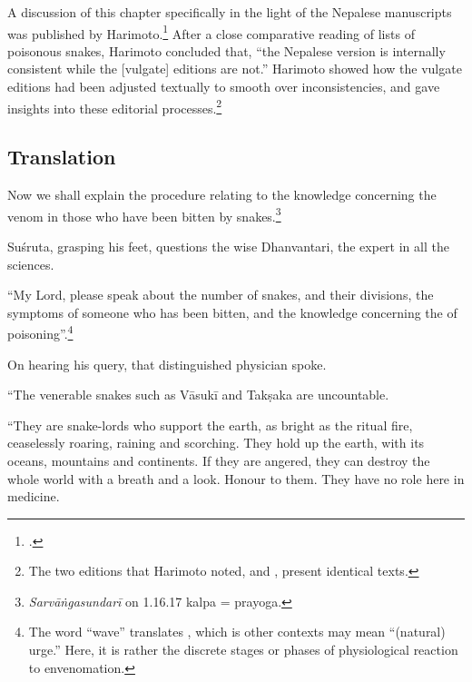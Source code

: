 A discussion of this chapter specifically in the light of the Nepalese
manuscripts was published by Harimoto.\footcite[101--104]{hari-2011} After a
close comparative reading of lists of poisonous snakes, Harimoto concluded
that, “the Nepalese version is internally consistent while the [vulgate]
editions are not.”  Harimoto showed how the vulgate editions had been
adjusted textually to smooth over inconsistencies, and gave insights into
these editorial processes.\footnote{The two editions that Harimoto noted,
    \cite{vulgate} and \cite{bhat-1889}, present identical texts.}


\subsection{Translation}

\begin{translation}
    \item[1] Now we shall explain the procedure relating to the
knowledge concerning the venom in those who have been bitten by 
snakes.\footnote{\emph{Sarvāṅgasundarī} on 1.16.17 kalpa = prayoga.}
    
    \item[3] Suśruta, grasping his feet, questions the wise Dhanvantari, the 
    expert in all the sciences.
    
    \item[4]
    
    “My Lord, please speak about the number of snakes, and their divisions,
the symptoms of someone who has been bitten, and the knowledge
concerning the  of poisoning”.\footnote{The word
    “wave” translates , which is other contexts may mean
    “(natural) urge.”  Here, it is rather the discrete stages or phases of
    physiological reaction to envenomation.}
        
    \item[5]
    
    On hearing his query, that distinguished physician spoke.
    
    “The venerable snakes such as Vāsukī and Takṣaka are uncountable. 
    
\item[6--9ab]

“They are snake-lords who support the earth, as bright as the ritual fire,
ceaselessly roaring, raining and scorching. They hold up the earth, with its
oceans, mountains and continents. If they are angered, they can destroy the
whole world with a breath and a look.  Honour to them. They have no role
here in medicine.


\end{translation}
